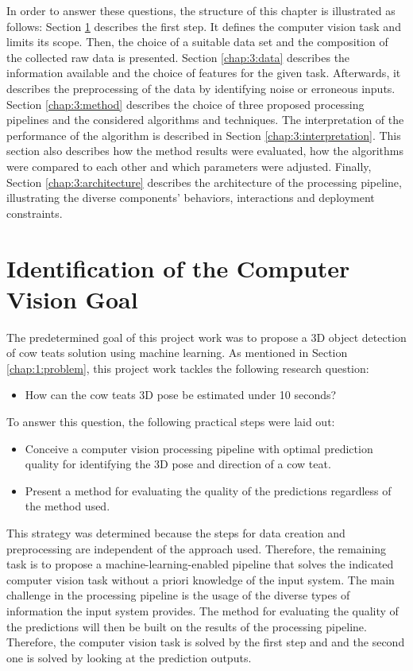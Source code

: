 In order to answer these questions, the structure of this chapter is illustrated as follows: Section \ref{chap:3:goal} describes the first step. It defines the computer vision task and limits its scope. Then, the choice of a suitable data set and the composition of the collected raw data is presented. Section \ref{chap:3:data} describes the information available and the choice of features for the given task. Afterwards, it describes the preprocessing of the data by identifying noise or erroneous inputs. Section \ref{chap:3:method} describes the choice of three proposed processing pipelines and the considered algorithms and techniques.  The interpretation of the performance of the algorithm is described in Section \ref{chap:3:interpretation}. This section also describes how the method results were evaluated, how the algorithms were compared to each other and which parameters were adjusted. Finally, Section \ref{chap:3:architecture} describes the architecture of the processing pipeline, illustrating the diverse components' behaviors, interactions and deployment constraints.

%  
\section{Identification of the Computer Vision Goal}\label{chap:3:goal}
The predetermined goal of this project work was to propose a 3D object detection of cow teats solution using machine learning. As mentioned in Section \ref{chap:1:problem}, this project work tackles the following research question: 
\begin{itemize}
    \item How can the cow teats 3D pose be estimated under 10 seconds?
\end{itemize}
To answer this question, the following practical steps were laid out:
\begin{itemize}
    \item Conceive a computer vision processing pipeline with optimal prediction quality for identifying the 3D pose and direction of a cow teat.
    \item Present a method for evaluating the quality of the predictions regardless of the method used.
\end{itemize}
This strategy was determined because the steps for data creation and preprocessing are independent of the approach used. Therefore, the remaining task is to propose a machine-learning-enabled pipeline that solves the indicated computer vision task without a priori knowledge of the input system. The main challenge in the processing pipeline is the usage of the diverse types of information the input system provides. The method for evaluating the quality of the predictions will then be built on the results of the processing pipeline. Therefore, the computer vision task is solved by the first step and and the second one is solved by looking at the prediction outputs.

